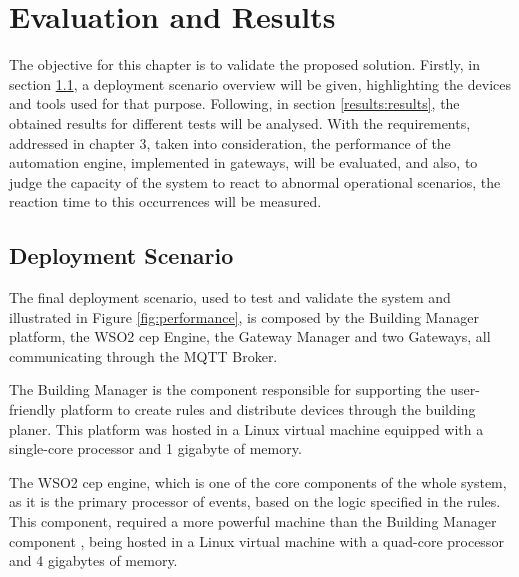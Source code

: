 \chapter{Evaluation and Results}
\label{chapter:evaluation_and_results}


The objective for this chapter is to validate the proposed solution. Firstly, in section \ref{results:scenario}, a deployment scenario overview will be given, highlighting the devices and tools used for that purpose. Following, in section \ref{results:results}, the obtained results for different tests will be analysed. With the requirements, addressed in chapter 3, taken into consideration, the performance of the automation engine, implemented in gateways, will be evaluated, and also, to judge the capacity of the system to react to abnormal operational scenarios, the reaction time to this occurrences will be measured.

\newpage

\section{Deployment Scenario}
\label{results:scenario}



The final deployment scenario, used to test and validate the system and illustrated in Figure \ref{fig:performance}, is composed by the Building Manager platform, the WSO2 \ac{cep} Engine, the Gateway Manager and two Gateways, all communicating through the MQTT Broker. 

The Building Manager is the component responsible for supporting the user-friendly platform to create rules and distribute devices through the building planer. This platform was hosted in a Linux virtual machine equipped with a single-core processor and 1 gigabyte of memory.

The WSO2 \ac{cep} engine, which is one of the core components of the whole system, as it is the primary processor of events, based on the logic specified in the rules. This component, required a more powerful machine than the Building Manager component , being hosted in a Linux virtual machine with a quad-core processor and 4 gigabytes of memory.

